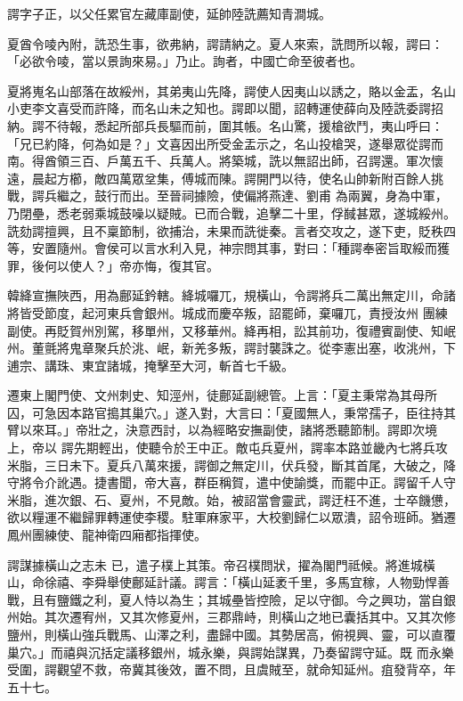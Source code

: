 \begin{pinyinscope}
 諤字子正，以父任累官左藏庫副使，延帥陸詵薦知青澗城。



 夏酋令㖫內附，詵恐生事，欲弗納，諤請納之。夏人來索，詵問所以報，諤曰：「必欲令㖫，當以景詢來易。」乃止。詢者，中國亡命至彼者也。



 夏將嵬名山部落在故綏州，其弟夷山先降，諤使人因夷山以誘之，賂以金盂，名山
 小吏李文喜受而許降，而名山未之知也。諤即以聞，詔轉運使薛向及陸詵委諤招納。諤不待報，悉起所部兵長驅而前，圍其帳。名山驚，援槍欲鬥，夷山呼曰：「兄已約降，何為如是？」文喜因出所受金盂示之，名山投槍哭，遂舉眾從諤而南。得酋領三百、戶萬五千、兵萬人。將築城，詵以無詔出師，召諤還。軍次懷遠，晨起方櫛，敵四萬眾坌集，傅城而陳。諤開門以待，使名山帥新附百餘人挑戰，諤兵繼之，鼓行而出。至晉祠據險，使偏將燕達、劉甫
 為兩翼，身為中軍，乃閉壘，悉老弱乘城鼓噪以疑賊。已而合戰，追擊二十里，俘馘甚眾，遂城綏州。詵劾諤擅興，且不稟節制，欲捕治，未果而詵徙秦。言者交攻之，遂下吏，貶秩四等，安置隨州。會侯可以言水利入見，神宗問其事，對曰：「種諤奉密旨取綏而獲罪，後何以使人？」帝亦悔，復其官。



 韓絳宣撫陜西，用為鄜延鈐轄。絳城囉兀，規橫山，令諤將兵二萬出無定川，命諸將皆受節度，起河東兵會銀州。城成而慶卒叛，詔罷師，棄囉兀，責授汝州
 團練副使。再貶賀州別駕，移單州，又移華州。絳再相，訟其前功，復禮賓副使、知岷州。董氈將鬼章聚兵於洮、岷，新羌多叛，諤討襲誅之。從李憲出塞，收洮州，下逋宗、講珠、東宜諸城，掩擊至大河，斬首七千級。



 遷東上閣門使、文州刺史、知涇州，徒鄜延副總管。上言：「夏主秉常為其母所囚，可急因本路官搗其巢穴。」遂入對，大言曰：「夏國無人，秉常孺子，臣往持其臂以來耳。」帝壯之，決意西討，以為經略安撫副使，諸將悉聽節制。諤即次境上，帝以
 諤先期輕出，使聽令於王中正。敵屯兵夏州，諤率本路並畿內七將兵攻米脂，三日未下。夏兵八萬來援，諤御之無定川，伏兵發，斷其首尾，大破之，降守將令介訛遇。捷書聞，帝大喜，群臣稱賀，遣中使諭獎，而罷中正。諤留千人守米脂，進次銀、石、夏州，不見敵。始，被詔當會靈武，諤迂枉不進，士卒饑憊，欲以糧運不繼歸罪轉運使李稷。駐軍麻家平，大校劉歸仁以眾潰，詔令班師。猶遷鳳州團練使、龍神衛四廂都指揮使。



 諤謀據橫山之志未
 已，遣子樸上其策。帝召樸問狀，擢為閣門祗候。將進城橫山，命徐禧、李舜舉使鄜延計議。諤言：「橫山延袤千里，多馬宜稼，人物勁悍善戰，且有鹽鐵之利，夏人恃以為生；其城壘皆控險，足以守御。今之興功，當自銀州始。其次遷宥州，又其次修夏州，三郡鼎峙，則橫山之地已囊括其中。又其次修鹽州，則橫山強兵戰馬、山澤之利，盡歸中國。其勢居高，俯視興、靈，可以直覆巢穴。」而禧與沉括定議移銀州，城永樂，與諤始謀異，乃奏留諤守延。既
 而永樂受圍，諤觀望不救，帝冀其後效，置不問，且虞賊至，就命知延州。疽發背卒，年五十七。




\end{pinyinscope}
